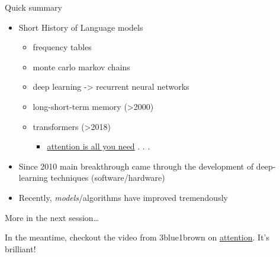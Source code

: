 \documentclass[
  ignorenonframetext,
]{beamer}
\providecommand{\tightlist}{%
  \setlength{\itemsep}{0pt}\setlength{\parskip}{0pt}}\usepackage{longtable,booktabs,array}
\begin{document}
\begin{frame}{Quick summary}
\label{quick-summary}
\begin{itemize}
\tightlist
\item
  Short History of Language models

  \begin{itemize}
  \tightlist
  \item
    frequency tables
  \item
    monte carlo markov chains
  \item
    deep learning -\textgreater{} recurrent neural networks
  \item
    long-short-term memory (\textgreater2000)
  \item
    transformers (\textgreater2018)

    \begin{itemize}
    \tightlist
    \item
      \href{https://arxiv.org/abs/1706.03762}{attention is all you need}
      . . .
    \end{itemize}
  \end{itemize}
\item
  Since 2010 main breakthrough came through the development of
  deep-learning techniques (software/hardware)
\item
  Recently, \emph{models}/algorithms have improved tremendously
\end{itemize}

\pause

More in the next session\ldots{}

In the meantime, checkout the video from 3blue1brown on
\href{https://www.youtube.com/watch?v=eMlx5fFNoYc}{attention}. It's
brilliant!
\end{frame}
\end{document}
